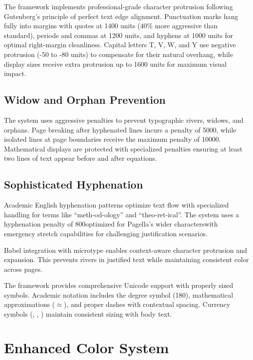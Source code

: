 \documentclass[11pt]{article}
\begin{document}
The framework implements professional-grade character protrusion following Gutenberg's principle of perfect text edge alignment. Punctuation marks hang fully into margins with quotes at 1400 units (40\% more aggressive than standard), periods and commas at 1200 units, and hyphens at 1000 units for optimal right-margin cleanliness. Capital letters T, V, W, and Y use negative protrusion (-50 to -80 units) to compensate for their natural overhang, while display sizes receive extra protrusion up to 1600 units for maximum visual impact.

\subsection{Widow and Orphan Prevention}

The system uses aggressive penalties to prevent typographic rivers, widows, and orphans. Page breaking after hyphenated lines incurs a penalty of 5000, while isolated lines at page boundaries receive the maximum penalty of 10000. Mathematical displays are protected with specialized penalties ensuring at least two lines of text appear before and after equations.

\subsection{Sophisticated Hyphenation}

Academic English hyphenation patterns optimize text flow with specialized handling for terms like \enquote{meth-od-ology} and \enquote{theo-ret-ical}. The system uses a hyphenation penalty of 800\emdash{}optimized for Pagella's wider characters\emdash{}with emergency stretch capabilities for challenging justification scenarios.

 Babel integration with microtype enables context-aware character protrusion and expansion. This prevents rivers in justified text while maintaining consistent color across pages.

 The framework provides comprehensive Unicode support with properly sized symbols. Academic notation includes the degree symbol (180\textdegree), mathematical approximations ($\approx$), and proper dashes with contextual spacing. Currency symbols (\texteuro, \textsterling, \textyen) maintain consistent sizing with body text.

\section{Enhanced Color System}
\end{document}
